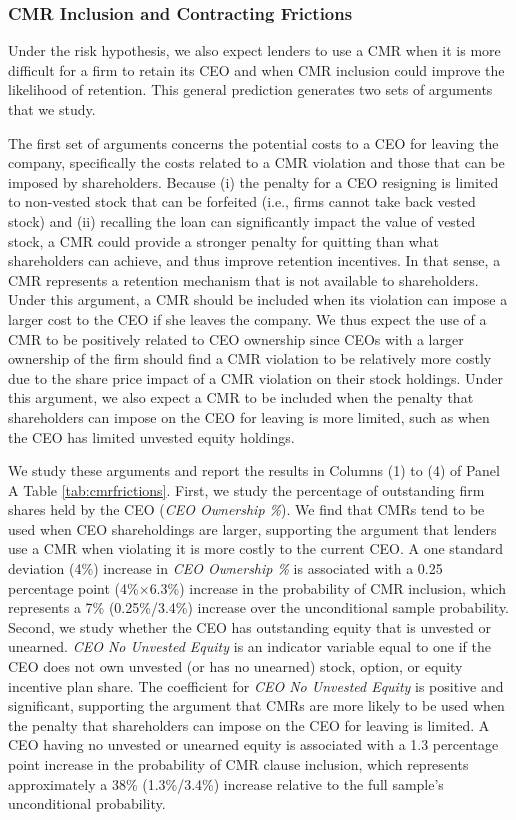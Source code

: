 \documentclass[a4paper,12pt]{article}
\begin{document}
\subsubsection{CMR Inclusion and Contracting Frictions}

Under the risk hypothesis, we also expect lenders to use a CMR when it is more difficult for a firm to retain its CEO and when CMR inclusion could improve the likelihood of retention.
This general prediction generates two sets of arguments that we study.

The first set of arguments concerns the potential costs to a CEO for leaving the company, specifically the costs related to a CMR violation and those that can be imposed by shareholders.
Because (i) the penalty for a CEO resigning is limited to non-vested stock that can be forfeited (i.e., firms cannot take back vested stock) and (ii) recalling the loan can significantly impact the value of vested stock, a CMR could provide a stronger penalty for quitting than what shareholders can achieve, and thus improve retention incentives.
In that sense, a CMR represents a retention mechanism that is not available to shareholders.
Under this argument, a CMR should be included when its violation can impose a larger cost to the CEO if she leaves the company. 
We thus expect the use of a CMR to be positively related to CEO ownership since CEOs with a larger ownership of the firm should find a CMR violation to be relatively more costly due to the share price impact of a CMR violation on their stock holdings.
Under this argument, we also expect a CMR to be included when the penalty that shareholders can impose on the CEO for leaving is more limited, such as when the CEO has limited unvested equity holdings.



We study these arguments and report the results in Columns (1) to (4) of Panel A Table \ref{tab:cmrfrictions}.
First, we study the percentage of outstanding firm shares held by the CEO (\textit{CEO Ownership \%}).
We find that CMRs tend to be used when CEO shareholdings are larger, supporting the argument that lenders use a CMR when violating it is more costly to the current CEO.
A one standard deviation (4\%) increase in \textit{CEO Ownership \%} is associated with a 0.25 percentage point (4\%$\times$6.3\%) increase in the probability of CMR inclusion, which represents a 7\% (0.25\%/3.4\%) increase over the unconditional sample probability.
Second, we study whether the CEO has outstanding equity that is unvested or unearned.
\textit{CEO No Unvested Equity} is an indicator variable equal to one if the CEO does not own unvested (or has no unearned) stock, option, or equity incentive plan share.
The coefficient for \textit{CEO No Unvested Equity} is positive and significant, supporting the argument that CMRs are more likely to be used when the penalty that shareholders can impose on the CEO for leaving is limited.
A CEO having no unvested or unearned equity is associated with a 1.3 percentage point increase in the probability of CMR clause inclusion, which represents approximately a 38\% (1.3\%/3.4\%) increase relative to the full sample's unconditional probability.
\end{document}
